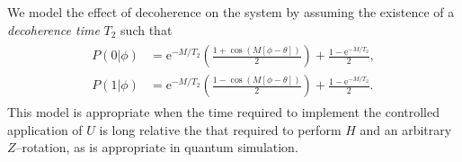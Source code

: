 \documentclass[aps,pra,amsmath,twocolumn,amssymb,superscriptaddress]{revtex4-1}
\newcommand{\ee}{\mathrm{e}}
\begin{document}
We model the effect of decoherence on the system by assuming the existence of a \emph{decoherence time} $T_2$ such that
\begin{gather}
    \label{eq:likedecohere}
    \begin{aligned}
        P(0|\phi) & = \ee^{-M/T_2}\left(\frac{1+\cos(M[\phi -\theta])}{2}\right)+\frac{1-\ee^{-M/T_2}}{2},\\
        P(1|\phi) & = \ee^{-M/T_2}\left(\frac{1-\cos(M[\phi -\theta])}{2}\right)+\frac{1-\ee^{-M/T_2}}{2}.
    \end{aligned}
\end{gather}
This model is appropriate when the time required to implement the controlled application of $U$ is long relative the that required to perform $H$ and an arbitrary $Z$--rotation, as is appropriate in quantum simulation.  %
 
\end{document}
